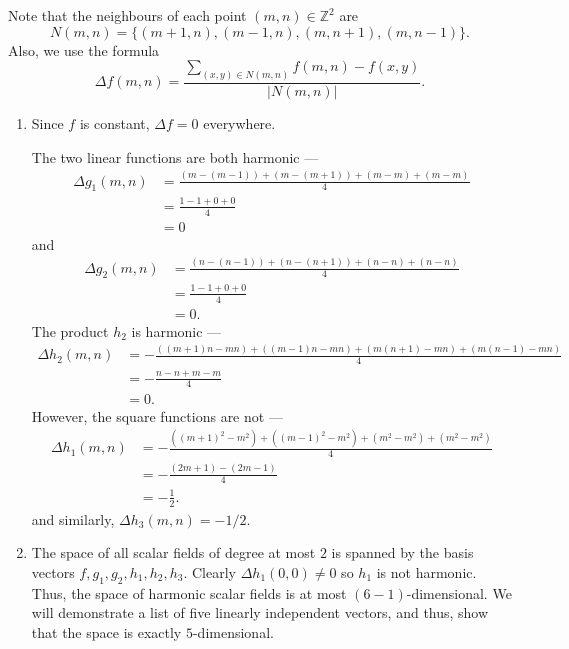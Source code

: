 \documentclass[12 pt, letterpaper]{hmcpset}
\begin{document}
\begin{solution}
	Note that the neighbours of each point $(m, n) \in \mathbb{Z}^{2}$ are
	\[
		N(m, n) = \{ (m + 1, n), (m - 1, n), (m, n + 1), (m, n - 1) \}.
	\]
	Also, we use the formula
	\[
		\Delta f(m, n) = \frac{\sum_{(x, y) \in N(m, n)} f(m, n) - f(x, y)}{\lvert N(m, n) \rvert}.
	\]
	\begin{enumerate}
		\item Since $f$ is constant, $\Delta f = 0$ everywhere.

			The two linear functions are both harmonic ---
			\begin{align*}
				\Delta g_{1}(m, n) & = \frac{(m - (m - 1)) + (m - (m + 1)) + (m - m) + (m - m)}{4} \\
						   & = \frac{1 - 1 + 0 + 0}{4} \\
						   & = 0
			\end{align*}
			and
			\begin{align*}
				\Delta g_{2}(m, n) & = \frac{(n - (n - 1)) + (n - (n + 1)) + (n - n) + (n - n)}{4} \\
						   & = \frac{1 - 1 + 0 + 0}{4} \\
						   & = 0.
			\end{align*}
			The product $h_{2}$ is harmonic ---
			\begin{align*}
				\Delta h_{2}(m, n) & = - \frac{((m + 1) n - mn) + ((m - 1)n - mn) + (m(n + 1) - mn) + (m(n - 1) - mn)}{4} \\
						   & = - \frac{n - n + m - m}{4} \\
						   & = 0.
			\end{align*}
			However, the square functions are not ---
			\begin{align*}
				\Delta h_{1}(m, n) & = - \frac{((m + 1)^{2} - m^{2}) + ((m - 1)^{2} - m^{2}) + (m^{2} - m^{2}) + (m^{2} - m^{2})}{4} \\
					     & = - \frac{(2m + 1) - (2m - 1)}{4} \\
					     & = - \frac{1}{2}.
			\end{align*}
			and similarly, $\Delta h_{3}(m, n) = -1/2$.

		\item The space of all scalar fields of degree at most $2$ is spanned by the basis vectors $f, g_{1}, g_{2}, h_{1}, h_{2}, h_{3}$. Clearly $\Delta h_{1}(0, 0) \neq 0$ so $h_{1}$ is not harmonic. Thus, the space of harmonic scalar fields is at most $(6 - 1)$-dimensional. We will demonstrate a list of five linearly independent vectors, and thus, show that the space is exactly $5$-dimensional. 



\end{enumerate}
\end{solution}
\end{document}
